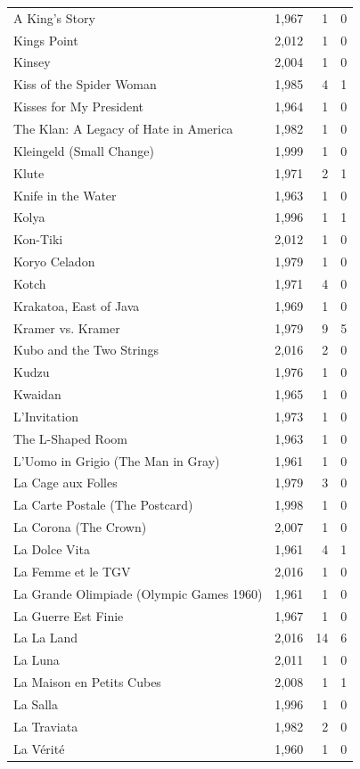 \begin{tabular}{lrrr}
A King's Story & 1,967 & 1 & 0 \\
Kings Point & 2,012 & 1 & 0 \\
Kinsey & 2,004 & 1 & 0 \\
Kiss of the Spider Woman & 1,985 & 4 & 1 \\
Kisses for My President & 1,964 & 1 & 0 \\
The Klan: A Legacy of Hate in America & 1,982 & 1 & 0 \\
Kleingeld (Small Change) & 1,999 & 1 & 0 \\
Klute & 1,971 & 2 & 1 \\
Knife in the Water & 1,963 & 1 & 0 \\
Kolya & 1,996 & 1 & 1 \\
Kon-Tiki & 2,012 & 1 & 0 \\
Koryo Celadon & 1,979 & 1 & 0 \\
Kotch & 1,971 & 4 & 0 \\
Krakatoa, East of Java & 1,969 & 1 & 0 \\
Kramer vs. Kramer & 1,979 & 9 & 5 \\
Kubo and the Two Strings & 2,016 & 2 & 0 \\
Kudzu & 1,976 & 1 & 0 \\
Kwaidan & 1,965 & 1 & 0 \\
L'Invitation & 1,973 & 1 & 0 \\
The L-Shaped Room & 1,963 & 1 & 0 \\
L'Uomo in Grigio (The Man in Gray) & 1,961 & 1 & 0 \\
La Cage aux Folles & 1,979 & 3 & 0 \\
La Carte Postale (The Postcard) & 1,998 & 1 & 0 \\
La Corona (The Crown) & 2,007 & 1 & 0 \\
La Dolce Vita & 1,961 & 4 & 1 \\
La Femme et le TGV & 2,016 & 1 & 0 \\
La Grande Olimpiade (Olympic Games 1960) & 1,961 & 1 & 0 \\
La Guerre Est Finie & 1,967 & 1 & 0 \\
La La Land & 2,016 & 14 & 6 \\
La Luna & 2,011 & 1 & 0 \\
La Maison en Petits Cubes & 2,008 & 1 & 1 \\
La Salla & 1,996 & 1 & 0 \\
La Traviata & 1,982 & 2 & 0 \\
La Vérité & 1,960 & 1 & 0 \\

\end{tabular}
